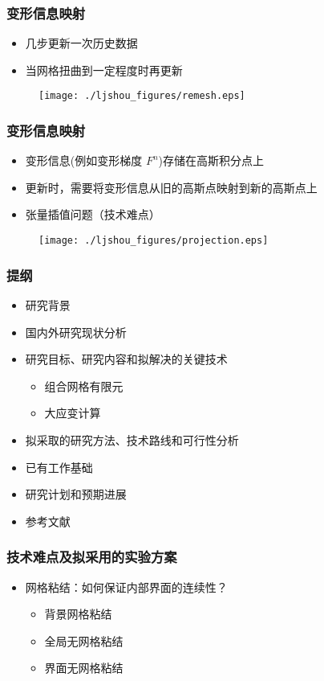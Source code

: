 \documentclass[mathserif]{beamer}
\begin{document}
\begin{CJK}{UTF8}{gkai}
		\begin{frame}
			\frametitle{变形信息映射}
			\begin{itemize}
				\item 几步更新一次历史数据
				\item 当网格扭曲到一定程度时再更新
			\end{itemize}
				\begin{figure}
					\centering
					\texttt{[image: ./ljshou\_figures/remesh.eps]}
			\end{figure}
		\end{frame}	
				
		\begin{frame}
			\frametitle{变形信息映射}
			\begin{itemize}
				\item 变形信息(例如变形梯度 $F^n$)存储在高斯积分点上
				\item 更新时，需要将变形信息从旧的高斯点映射到新的高斯点上
				\item 张量插值问题（技术难点）
			\end{itemize}
	\begin{figure}
		\centering
		\texttt{[image: ./ljshou\_figures/projection.eps]}
	\end{figure}
		\end{frame}	
			
	\begin{frame}
        \frametitle{提纲}
        \begin{itemize}
            \color{gray} 
            \item 研究背景
            \item 国内外研究现状分析
            \item 研究目标、研究内容和拟解决的关键技术
		  	\begin{itemize}
		    		\color{gray}
		  		\item 组合网格有限元
				\item 大应变计算
		  	\end{itemize}
            \item {\color{blue}拟采取的研究方法、技术路线和可行性分析}
            \item 已有工作基础
	    \item 研究计划和预期进展
            \item 参考文献
        \end{itemize}
	\end{frame}
		
			
		\begin{frame}
			\frametitle{技术难点及拟采用的实验方案}
			\begin{itemize}
				\item 网格粘结：如何保证内部界面的连续性？
				\begin{itemize}
					\item 背景网格粘结
					\item 全局无网格粘结
					\item 界面无网格粘结
				\end{itemize}
			

\end{itemize}
\end{frame}
\end{CJK}
\end{document}

